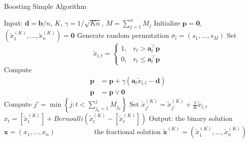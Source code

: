 \documentclass{article} %
\begin{document}
\begin{algorithm}[ht!]
\caption{Boosting Simple Algorithm}
\label{alg:BSA}
\begin{algorithmic}[1]
\State Input: $\bm{d}=\bm{b}/n$, $K$, $\gamma=1/\sqrt{Kn}$, $M=\sum\limits_{j=1}^{n}M_j$
\State Initialize $\bm{p} = \bm{0}$, $\left(\tilde{{x}}^{(K)}_1,...,\tilde{{x}}^{(K)}_n\right)=\bm{0}$
    \State Generate random permutation $\sigma_l=(s_1,...,s_M)$
        \State Set 
            $$\tilde{x}_{l,t} = \begin{cases}
            1,& r_{t} >\bm{a}_{t}^\top \bm{p} \\
            0,& r_{t} \le \bm{a}_{t}^\top \bm{p} 
            \end{cases}$$
            \State Compute
            \begin{align*}
                \bm{p} & = \bm{p} + \gamma \left(\bm{a}_{t}\tilde{x}_{l,t} - \bm{d}\right) \\
                \bm{p} & = \bm{p} \vee \bm{0}
            \end{align*}
        \State Compute $j'=\min\left\{j: t<\sum\limits_{j_0=1}^{j}M_{j_0}\right\}$
        \State Set $\tilde{{x}}^{(K)}_{j'}=\tilde{{x}}^{(K)}_{j'}+\frac{1}{K}\tilde{x}_{l,t}$
    \EndFor
\EndFor
{}
    \State $x_t = [\tilde{{x}}^{(K)}_{t}]+Bernoulli(\tilde{{x}}^{(K)}_{t}-[\tilde{{x}}^{(K)}_{t}])$
\EndFor
\State Output: the binary solution $\bm{x} = (x_1,...,x_n)$ 
\State ~~ ~~ ~~ ~~ the fractional solution $\tilde{\bm{x}}^{(K)}= (\tilde{x}_1^{(K)},...,\tilde{x}_n^{(K)})$
\end{algorithmic}
\end{algorithm}
\end{document}
